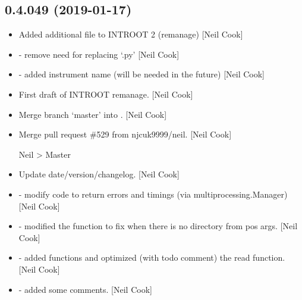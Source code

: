 \documentclass[a4paper,10pt,english]{report}
\begin{document}
\subsection{0.4.049 (2019-01-17)}
\label{\detokenize{misc/changelog:id215}}\begin{itemize}
\item {} 
Added additional file to INTROOT 2 (remanage) {[}Neil Cook{]}

\item {} 
 - remove need for replacing ‘.py’ {[}Neil Cook{]}

\item {} 
 - added instrument name (will be needed in the
future) {[}Neil Cook{]}

\item {} 
First draft of INTROOT remanage. {[}Neil Cook{]}

\item {} 
Merge branch ‘master’ into . {[}Neil Cook{]}

\item {} 
Merge pull request \#529 from njcuk9999/neil. {[}Neil Cook{]}

Neil \textendash{}\textgreater{} Master

\item {} 
Update date/version/changelog. {[}Neil Cook{]}

\item {} 
 - modify code to return errors and timings (via
multiprocessing.Manager) {[}Neil Cook{]}

\item {} 
 - modified the  function to
fix when there is no directory from pos args. {[}Neil Cook{]}

\item {} 
 - added  functions and optimized
(with todo comment) the read function. {[}Neil Cook{]}

\item {} 
 - added some comments. {[}Neil Cook{]}

\end{itemize}
\end{document}
